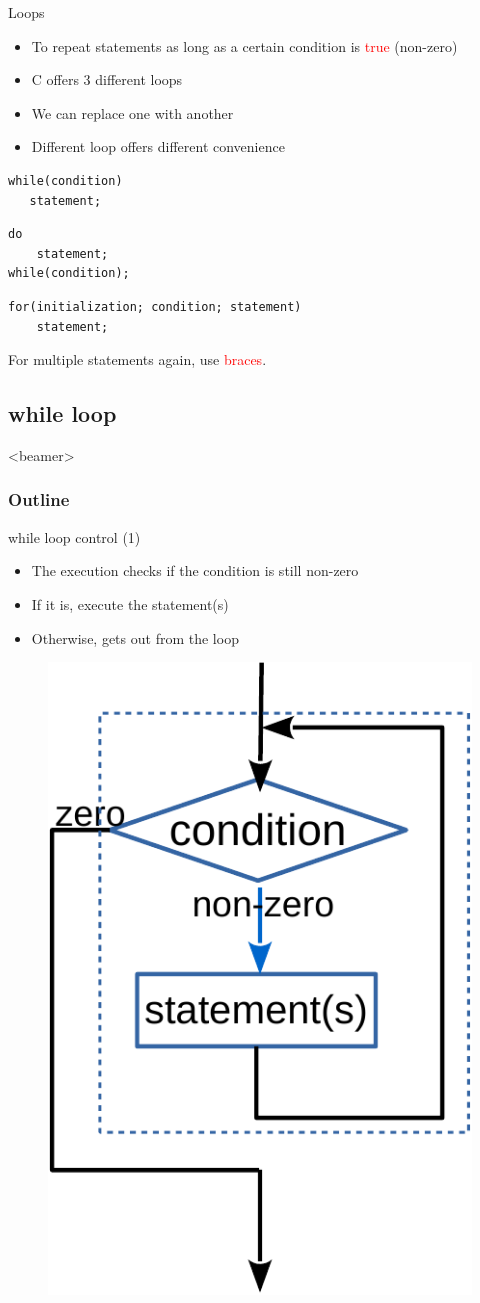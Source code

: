 \begin{frame}[fragile]{Loops}
\vspace{-0.1in}
\begin{itemize}
   \item {To repeat statements as long as a certain condition is \textcolor{red}{true} (non-zero)}
   \item {C offers 3 different loops}
   \item {We can replace one with another}
   \item {Different loop offers different convenience}
\end{itemize}
\vspace{-0.1in}
	\begin{lstlisting}[numbers=none]
while(condition)
   statement;
\end{lstlisting}
\vspace{-0.1in}
	\begin{lstlisting}[numbers=none]
do
    statement;
while(condition);
\end{lstlisting}
\vspace{-0.1in}
	\begin{lstlisting}[numbers=none]
for(initialization; condition; statement)
    statement;
\end{lstlisting}
	For multiple statements again, use \textcolor{red}{braces}.
\end{frame}

\subsection{while loop}
\label{sec:while}
\begin{frame}<beamer>
    \frametitle{Outline}
\end{frame}

\begin{frame}[fragile]{while loop control (1)}
\begin{itemize}
	\item {The execution checks if the condition is still non-zero}
	\item {If it is, execute the statement(s)}
	\item {Otherwise, gets out from the loop}
\end{itemize}
\begin{figure}
	\includegraphics[width=0.25\linewidth]{figs/while.pdf}
\end{figure}
\end{frame}

